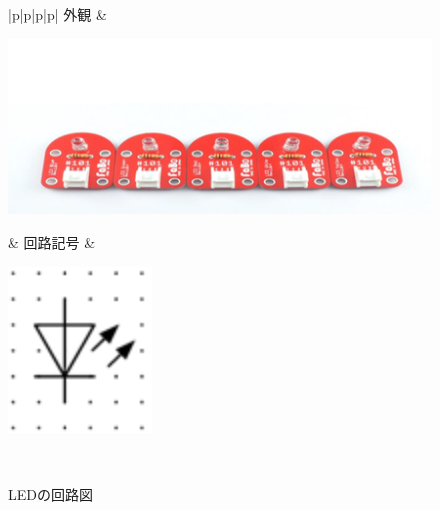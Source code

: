 \begin{figure}[H]
	\begin{tabular}{|p{\colH}|p{\colI}|p{\colH}|p{\colI}|} \hline
	外観 & 
	\begin{minipage}[t]{\linewidth}
    \smallskip
      \centering
      \includegraphics[width=\linewidth]{images/chap05/text05-img016.png}
      \caption{LED}
      \smallskip
    \end{minipage} &
    回路記号 & 
    \begin{minipage}[t]{\linewidth}
    \smallskip
      \centering
      \includegraphics[width=\linewidth]{images/chap05/text05-img043.png}
      \caption{LEDの回路図}
      \smallskip
    \end{minipage}\\ \hline
  \end{tabular}
\end{figure}
